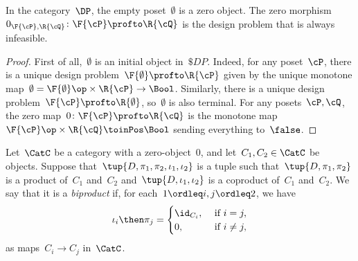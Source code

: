 \begin{lemma}
  In the category~$\DP$, the empty poset~$\emptyset$ is a zero object. The zero morphism~$0_{\F{\cP},\R{\cQ}}\colon \F{\cP} \profto \R{\cQ}$ is the design problem that is always infeasible.
\end{lemma}
\begin{proof}
  First of all,~$\emptyset$ is an initial object in~$\$DP$. Indeed, for any poset~$\cP $, there is a unique design problem~$\F{\emptyset} \profto \R{\cP}$ given by the unique monotone map~$\emptyset=\F{\emptyset}\op\times \R{\cP} \to\Bool$. Similarly, there is a unique design problem~$\F{\cP} \profto \R{\emptyset}$, so~$\emptyset$ is also terminal. For any posets~$\cP ,\cQ$, the zero map~$0 \colon \F{\cP} \profto \R{\cQ}$ is the monotone map~$\F{\cP} \op\times \R{\cQ} \toinPos \Bool$ sending everything to~$\false$.
\end{proof}

\begin{ctdefinition}[Biproduct]
  Let~$\CatC$ be a category with a zero-object~$0$, and let~$C_1,C_2\in\CatC$ be objects. Suppose that~$\tup{D,\pi_1,\pi_2,\iota_1,\iota_2}$ is a tuple such that~$\tup{D,\pi_1,\pi_2}$ is a product of~$C_1$ and~$C_2$ and~$\tup{D,\iota_1,\iota_2}$ is a coproduct of~$C_1$ and~$C_2$. We say that it is a \emph{biproduct} if, for each~$1\ordleq i,j\ordleq 2$, we have
  \begin{equation}
    \iota_i\then \pi_j=
    \begin{cases}
      \id_{C_i}, &\text{ if }i=j,\\
      0, &\text{ if }i\neq j,
    \end{cases} \label{eq:biproduct-condition}
  \end{equation}
  as maps~$C_i\to C_j$ in~$\CatC$.
\end{ctdefinition}

